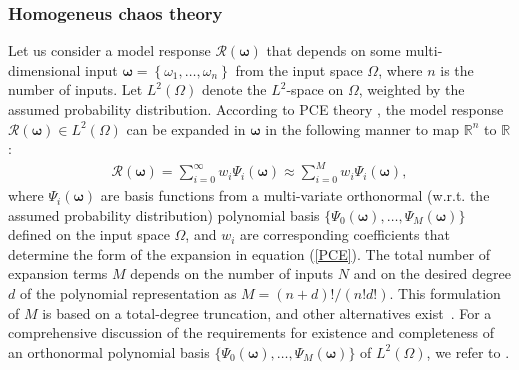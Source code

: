 \documentclass[a4paper,fleqn]{article}
\newcommand{\rw}[1]{\textcolor{blue}{#1}}
\renewcommand{\rw}[1]{#1}
\begin{document}
\subsubsection{Homogeneus chaos theory}
\label{ML_aPC_chaos}
Let us consider a model response $\mathcal{R}(\bm{\omega})$ that depends on some multi-dimensional input $\bm{\omega}=\left\{\omega_1,\ldots,\omega_n \right\}$ from the input space $\Omega$, where $n$ is the number of inputs.
\rw{Let $L^2(\Omega)$ denote the $L^2$-space on $\Omega$, weighted by the assumed probability distribution.}
According to PCE theory \cite{MR0020230,Wiener1938}, the model response $\mathcal{R}(\bm{\omega})\in L^2(\Omega)$ can be expanded in $\bm{\omega}$ in the following manner to map $\mathbb{R}^n$ to $\mathbb{R}$:
%
\begin{eqnarray}
\label{PCE}
  \displaystyle \mathcal{R}(\bm{\omega}) = \sum_{i=0}^{\infty} w_{i} \Psi_i(\bm{\omega}) \approx \sum_{i=0}^{M} w_{i} \Psi_i(\bm{\omega}),
\end{eqnarray}
%
where $\Psi_i(\bm{\omega})$ are basis functions from a multi-variate orthonormal 
\rw{(w.r.t. the assumed probability distribution)}
polynomial basis $\big\{ \Psi_0(\bm{\omega}),\ldots, \Psi_M(\bm{\omega})\big\}$ defined on the input space $\Omega$, and $w_{i}$ are corresponding  coefficients that determine the form of the expansion in equation (\ref{PCE}). The total number of expansion terms $M$ depends on the number of inputs $N$ and on the desired degree $d$ of the polynomial representation as $M = (n+d)!/(n!d!)$. This formulation of $M$ is based on a total-degree truncation, and other alternatives exist\rw{~\cite{MR3364576}}. For a comprehensive discussion of the requirements for existence and completeness
of an orthonormal polynomial basis $\big\{\Psi_0(\bm{\omega}),\ldots,\Psi_M(\bm{\omega})\big\}$ of $L^2(\Omega)$,
we refer to \cite{MR2855645,MR2061539,MR3364576}.
\end{document}
